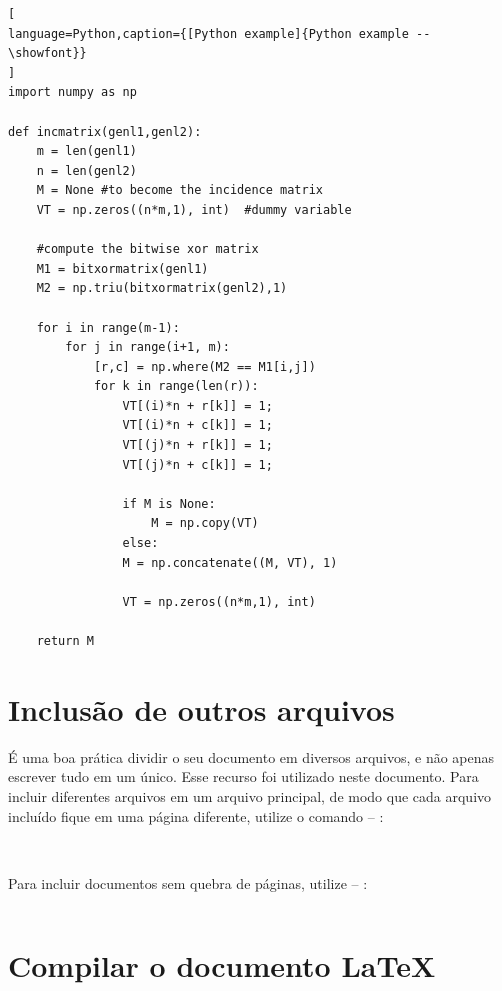 \begin{lstlisting}[
language=Python,caption={[Python example]{Python example -- \showfont}}
]
import numpy as np

def incmatrix(genl1,genl2):
    m = len(genl1)
    n = len(genl2)
    M = None #to become the incidence matrix
    VT = np.zeros((n*m,1), int)  #dummy variable

    #compute the bitwise xor matrix
    M1 = bitxormatrix(genl1)
    M2 = np.triu(bitxormatrix(genl2),1)

    for i in range(m-1):
        for j in range(i+1, m):
            [r,c] = np.where(M2 == M1[i,j])
            for k in range(len(r)):
                VT[(i)*n + r[k]] = 1;
                VT[(i)*n + c[k]] = 1;
                VT[(j)*n + r[k]] = 1;
                VT[(j)*n + c[k]] = 1;

                if M is None:
                    M = np.copy(VT)
                else:
                M = np.concatenate((M, VT), 1)

                VT = np.zeros((n*m,1), int)

    return M
\end{lstlisting}

\section{Inclusão de outros arquivos}\label{sec-include}

É uma boa prática dividir o seu documento em diversos arquivos, e não
apenas escrever tudo em um único. Esse recurso foi utilizado neste
documento. Para incluir diferentes arquivos em um arquivo principal,
de modo que cada arquivo incluído fique em uma página diferente, utilize o
comando -- \showfont:

\begin{lstlisting}[language=tex]
   
\end{lstlisting}

Para incluir documentos sem quebra de páginas, utilize -- \showfont:

\begin{lstlisting}[language=tex]
         % sem a extensão .tex
\end{lstlisting}

\section{Compilar o documento \LaTeX{}}

